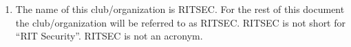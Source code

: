 

\begin{enumerate}
  \item The name of this club/organization is RITSEC. For the rest of this
    document the club/organization will be referred to as RITSEC. RITSEC is not
    short for “RIT Security”. RITSEC is not an acronym.
\end{enumerate}